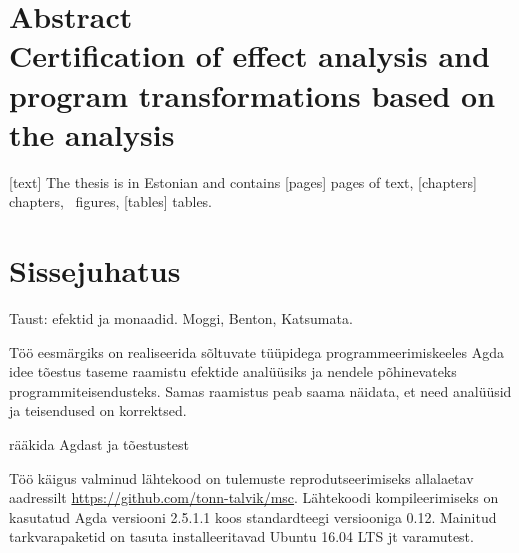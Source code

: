 \documentclass[a4paper,12pt]{article}
\begin{document}
\section*{\vskip 60pt\centering Abstract\\
Certification of effect analysis and program transformations based on the analysis}
[text]
The thesis is in Estonian and contains [pages] pages of text, [chapters] chapters, \totalfigures\ figures, [tables] tables.
\clearpage

\tableofcontents
\clearpage

\listoffigures
\clearpage







\section{Sissejuhatus}

Taust: efektid ja monaadid. Moggi, Benton, Katsumata.


Töö eesmärgiks on realiseerida sõltuvate tüüpidega programmeerimiskeeles Agda idee tõestus taseme
raamistu efektide analüüsiks ja nendele põhinevateks programmiteisendusteks.
Samas raamistus peab saama näidata, et need analüüsid ja teisendused on korrektsed.



rääkida Agdast ja tõestustest

Töö käigus valminud lähtekood on tulemuste reprodutseerimiseks allalaetav aadressilt \url{https://github.com/tonn-talvik/msc}.
Lähtekoodi kompileerimiseks on kasutatud Agda versiooni 2.5.1.1 koos standardteegi versiooniga 0.12.
Mainitud tarkvarapaketid on tasuta installeeritavad Ubuntu 16.04 LTS jt varamutest.
\end{document}
